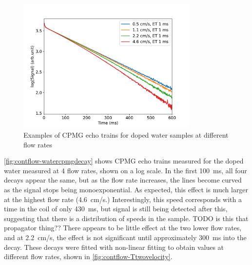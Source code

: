 \begin{figure}[ht]
\centering
\includegraphics[width=0.8\textwidth]{figures/contflow/dopedwatercpmgdecay.pdf}
\caption{Examples of CPMG echo trains for doped water samples at different flow rates}
\label{fig:contflow-watercpmgdecay}
\end{figure}

\autoref{fig:contflow-watercpmgdecay} shows CPMG echo trains measured for the doped water measured at 4 flow rates, shown on a log scale.
In the first \SI{100}{ms}, all four decays appear the same, but as the flow rate increases, the lines become curved as the signal stops being monoexponential.
As expected, this effect is much larger at the highest flow rate (\SI{4.6}{cm/s}.)
Interestingly, this speed corresponds with a time in the coil of only \SI{430}{ms}, but signal is still being detected after this, suggesting that there is a distribution of speeds in the sample. TODO is this that propagator thing??
There appears to be little effect at the two lower flow rates, and at \SI{2.2}{cm/s}, the effect is not significant until approximately \SI{300}{ms} into the decay.
These decays were fitted with non-linear fitting to obtain \Ttwo values at different flow rates, shown in \autoref{fig:contflow-Ttwovelocity}.

